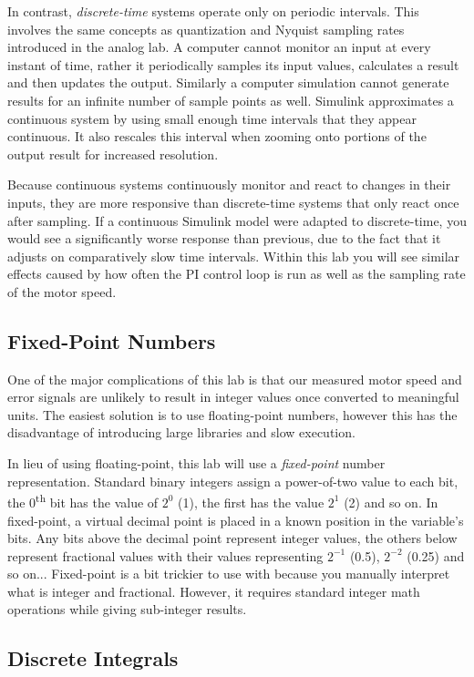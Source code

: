 \documentclass[openany,11pt,fleqn]{book} %
\begin{document}
In contrast, \textit{discrete-time} systems operate only on periodic intervals. This involves the same concepts as quantization and Nyquist sampling rates introduced in the analog lab. A computer cannot monitor an input at every instant of time, rather it periodically samples its input values, calculates a result and then updates the output. Similarly a computer simulation cannot generate results for an infinite number of sample points as well. Simulink approximates a continuous system by using small enough time intervals that they appear continuous. It also rescales this interval when zooming onto portions of the output result for increased resolution. 

Because continuous systems continuously monitor and react to changes in their inputs, they are more responsive than discrete-time systems that only react once after sampling. If a continuous Simulink model were adapted to discrete-time, you would see a significantly worse response than previous, due to the fact that it adjusts on comparatively slow time intervals. Within this lab you will see similar effects caused by how often the PI control loop is run as well as the sampling rate of the motor speed.  

\subsection{Fixed-Point Numbers}
One of the major complications of this lab is that our measured motor speed and error signals are unlikely to result in integer values once converted to meaningful units. The easiest solution is to use floating-point numbers, however this has the disadvantage of introducing large libraries and slow execution. 

In lieu of using floating-point, this lab will use a \textit{fixed-point} number representation. Standard binary integers assign a power-of-two value to each bit, the 0\textsuperscript{th} bit has the value of $2^{0}$ (1), the first has the value $2^{1}$ (2) and so on. In fixed-point, a virtual decimal point is placed in a known position in the variable's bits. Any bits above the decimal point represent integer values, the others below represent fractional values with their values representing $2^{-1}$ (0.5), $2^{-2}$ (0.25) and so on...
Fixed-point is a bit trickier to use with because you manually interpret what is integer and fractional. However, it requires standard integer math operations while giving sub-integer results. 


\subsection{Discrete Integrals}
\end{document}
